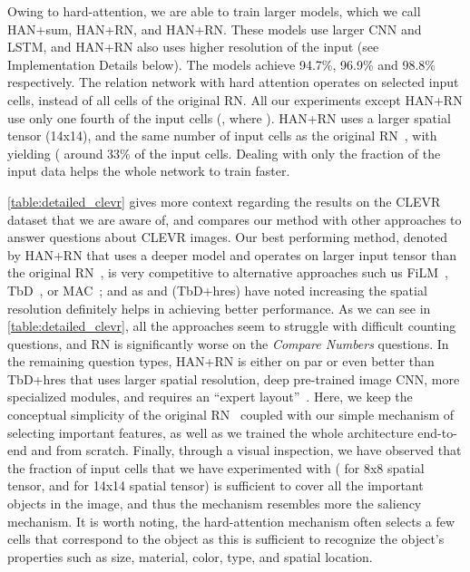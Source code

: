 Owing to hard-attention, we are able to train larger models, which we call HAN+sum, HAN+RN, and HAN+RN.
These models use larger CNN and LSTM, and HAN+RN also uses higher resolution of the input (see Implementation Details below). The models
achieve 94.7\%, 96.9\% and 98.8\% respectively.
The relation network with hard attention operates on  selected input cells, instead of all  cells of the original RN. 
All our experiments except HAN+RN use only one fourth of the input cells (, where ). HAN+RN uses a larger spatial tensor (14x14), and the same number of input cells as the original RN~\cite{santoro2017simple}, with  yielding ( around 33\% of the input cells. Dealing with only the fraction of the input data helps the whole network to train faster.

\autoref{table:detailed_clevr} gives more context regarding the results on the CLEVR dataset that we are aware of, and compares our method with other approaches to answer questions about CLEVR images. Our best performing method, denoted by HAN+RN that uses a deeper model and operates on larger input tensor than the original RN~\cite{santoro2017simple}, is very competitive to alternative approaches such us  FiLM~\cite{perez2017film}, TbD~\cite{mascharka2018transparency}, or MAC~\cite{hudson2018compositional}; and as \cite{santoro2017simple} and \cite{mascharka2018transparency} (TbD+hres) have noted increasing the spatial resolution definitely helps in achieving better performance.
As we can see in \autoref{table:detailed_clevr}, all the approaches seem to struggle with difficult counting questions, and RN is significantly worse on the {\it Compare Numbers} questions. In the remaining question types, HAN+RN is either on par or even better than TbD+hres that uses larger spatial resolution, deep pre-trained image CNN, more specialized modules, and requires an ``expert layout''~\cite{explainable2018eccv}. 
Here, we keep the conceptual simplicity of the original RN~\cite{santoro2017simple} coupled with our simple mechanism of selecting important features, as well as we trained the whole architecture end-to-end and from scratch.
Finally, through a visual inspection, we have observed that the fraction of input cells that we have experimented with ( for 8x8 spatial tensor, and  for 14x14 spatial tensor) is sufficient to cover all the important objects in the image, and thus the mechanism resembles more the saliency mechanism. It is worth noting, the hard-attention mechanism often selects a few cells that correspond to the object as this is sufficient to recognize the object's properties such as size, material, color, type, and spatial location.


